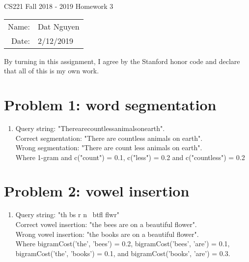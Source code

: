 \documentclass[12pt]{article}
\begin{document}
\begin{center}
{\Large CS221 Fall 2018 - 2019 Homework 3}

\begin{tabular}{rl}     
Name: & Dat Nguyen \\
Date: & 2/12/2019
\end{tabular}
\end{center}
 
 By turning in this assignment, I agree by the Stanford honor code and declare
that all of this is my own work.

\section*{Problem 1: word segmentation}
\begin{enumerate}[label=(\alph*)]
    \item
    Query string: "Therearecountlessanimalsonearth". \\
    Correct segmentation: "There are countless animals on earth". \\
    Wrong segmentation: "There are count less animals on earth". \\
    Where 1-gram and c("count") = 0.1, c("less") = 0.2 and c("countless") = 0.2 
\end{enumerate}

\section*{Problem 2: vowel insertion}
\begin{enumerate}[label=(\alph*)]
    \item
    Query string: "th bs r n \ btfl flwr" \\
    Correct vowel insertion: "the bees are on a beautiful flower". \\
    Wrong vowel insertion: "the books are on a beautiful flower". \\
    Where bigramCost('the', 'bees') = 0.2, bigramCost('bees', 'are') = 0.1, 
    bigramCost('the', 'books') = 0.1, and bigramCost('books', 'are') = 0.3.
\end{enumerate}
\end{document}
